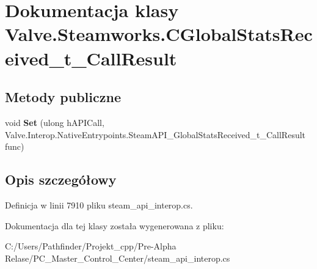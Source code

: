 \hypertarget{class_valve_1_1_steamworks_1_1_c_global_stats_received__t___call_result}{}\section{Dokumentacja klasy Valve.\+Steamworks.\+C\+Global\+Stats\+Received\+\_\+t\+\_\+\+Call\+Result}
\label{class_valve_1_1_steamworks_1_1_c_global_stats_received__t___call_result}
\subsection*{Metody publiczne}
\begin{DoxyCompactItemize}
\item 
\mbox{\label{class_valve_1_1_steamworks_1_1_c_global_stats_received__t___call_result_a5cfdf45b1c063e678f25cb3724dbc51a}} 
void {\bfseries Set} (ulong h\+A\+P\+I\+Call, Valve.\+Interop.\+Native\+Entrypoints.\+Steam\+A\+P\+I\+\_\+\+Global\+Stats\+Received\+\_\+t\+\_\+\+Call\+Result func)
\end{DoxyCompactItemize}


\subsection{Opis szczegółowy}


Definicja w linii 7910 pliku steam\+\_\+api\+\_\+interop.\+cs.



Dokumentacja dla tej klasy została wygenerowana z pliku\+:\begin{DoxyCompactItemize}
\item 
C\+:/\+Users/\+Pathfinder/\+Projekt\+\_\+cpp/\+Pre-\/\+Alpha Relase/\+P\+C\+\_\+\+Master\+\_\+\+Control\+\_\+\+Center/steam\+\_\+api\+\_\+interop.\+cs\end{DoxyCompactItemize}
